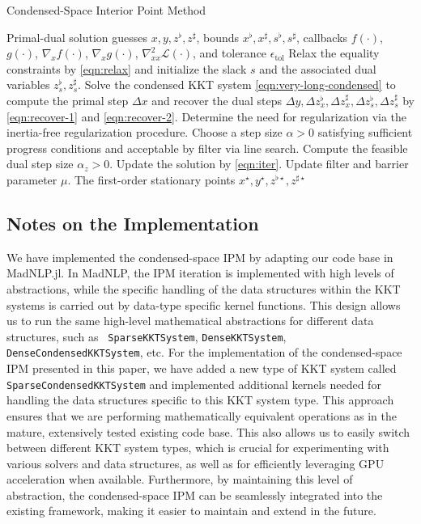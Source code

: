 \begin{algorithm}[t]
  \caption{Condensed-Space Interior Point Method}
  \label{alg:con-ipm}
  \begin{algorithmic}[1]
    \REQUIRE Primal-dual solution guesses $x,y, z^\flat, z^\sharp$, bounds $x^\flat,x^\sharp, s^\flat, s^\sharp$, callbacks $f(\cdot)$, $g(\cdot)$, $\nabla_x f(\cdot)$, $\nabla_x g(\cdot)$, $\nabla^2_{xx} \mathcal{L}(\cdot)$, and tolerance $\epsilon_{\text{tol}}$
    \STATE Relax the equality constraints by \eqref{eqn:relax} and initialize the slack $s$ and the associated dual variables $z^\flat_s, z^\sharp_s$.
    \STATE Solve the condensed KKT system \eqref{eqn:very-long-condensed} to compute the primal step $\Delta x$ and recover the dual steps $\Delta y, \Delta z_x^\flat, \Delta z_x^\sharp, \Delta z_s^\flat, \Delta z_s^\sharp$ by \eqref{eqn:recover-1} and \eqref{eqn:recover-2}.
    \STATE Determine the need for regularization via the inertia-free regularization procedure.
    \STATE Choose a step size $\alpha>0$ satisfying sufficient progress conditions and acceptable by filter via line search.
    \STATE Compute the feasible dual step size $\alpha_z>0$.
    \STATE Update the solution by \eqref{eqn:iter}.
    \STATE Update filter and barrier parameter $\mu$.
    \ENDWHILE
    \RETURN The first-order stationary points $x^\star,y^\star, z^{\flat\star}, z^{\sharp\star}$
  \end{algorithmic}
\end{algorithm}

\subsection{Notes on the Implementation}

We have implemented the condensed-space IPM by adapting our code base
in MadNLP.jl. In MadNLP, the IPM iteration is implemented with high
levels of abstractions, while the specific handling of the data
structures within the KKT systems is carried out by data-type specific
kernel functions. This design allows us to run the same high-level
mathematical abstractions for different data structures, such as {\tt
  SparseKKTSystem}, {\tt DenseKKTSystem}, {\tt DenseCondensedKKTSystem},
etc. For the implementation of the condensed-space IPM presented in
this paper, we have added a new type of KKT system called {\tt
  SparseCondensedKKTSystem} and implemented additional kernels needed
for handling the data structures specific to this KKT system
type. This approach ensures that we are performing mathematically
equivalent operations as in the mature, extensively tested existing
code base. This also allows us to easily switch between different KKT
system types, which is crucial for experimenting with various solvers
and data structures, as well as for efficiently leveraging GPU
acceleration when available. Furthermore, by maintaining this level of
abstraction, the condensed-space IPM can be seamlessly integrated into
the existing framework, making it easier to maintain and extend in the
future.

